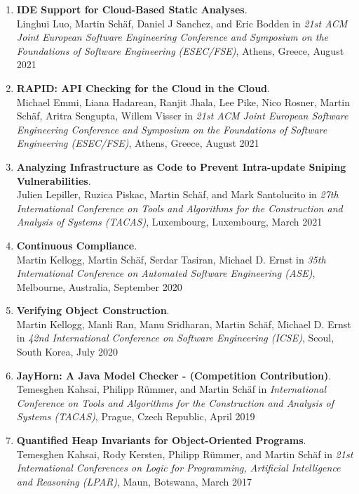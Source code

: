 \begin{enumerate}
\item \textbf{IDE Support for Cloud-Based Static Analyses}.
\\ Linghui Luo, Martin Sch\"af, Daniel J Sanchez, and Eric Bodden in 
\emph{21st ACM Joint European Software Engineering Conference and Symposium on the Foundations of Software Engineering (ESEC/FSE)},
Athens, Greece, August 2021

\item \textbf{RAPID: API Checking for the Cloud in the Cloud}.
\\ Michael Emmi, Liana Hadarean, Ranjit Jhala, Lee Pike, Nico Rosner, Martin Sch\"af, Aritra Sengupta, Willem Visser in 
\emph{21st ACM Joint European Software Engineering Conference and Symposium on the Foundations of Software Engineering (ESEC/FSE)},
Athens, Greece, August 2021

\item \textbf{Analyzing Infrastructure as Code to Prevent Intra-update Sniping Vulnerabilities}.
\\ Julien Lepiller, Ruzica Piskac, Martin Sch\"af, and Mark Santolucito in 
\emph{27th International Conference on Tools and Algorithms for the Construction and Analysis of Systems (TACAS)},
Luxembourg, Luxembourg, March 2021

\item \textbf{Continuous Compliance}.
\\ Martin Kellogg, Martin Sch\"af, Serdar Tasiran, Michael D. Ernst in 
\emph{35th International Conference on Automated Software Engineering (ASE)},
Melbourne, Australia, September 2020

\item \textbf{Verifying Object Construction}.
\\ Martin Kellogg, Manli Ran, Manu Sridharan, Martin Sch\"af, Michael D. Ernst in 
\emph{42nd International Conference on Software Engineering (ICSE)},
Seoul, South Korea, July 2020

\item \textbf{JayHorn: A Java Model Checker - (Competition Contribution)}.
\\ Temesghen Kahsai, Philipp R\"ummer, and Martin Sch\"af in 
\emph{International Conference on Tools and Algorithms for the Construction and Analysis of Systems (TACAS)},
Prague, Czech Republic, April 2019

\item \textbf{Quantified Heap Invariants for Object-Oriented Programs}.
\\ Temesghen Kahsai, Rody Kersten, Philipp R\"ummer, and Martin Sch\"af in 
\emph{21st International Conferences on Logic for Programming, Artificial Intelligence and Reasoning (LPAR)},
Maun, Botswana, March 2017


\end{enumerate}
